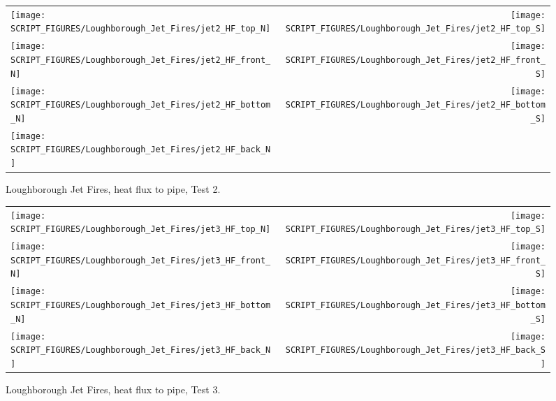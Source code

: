 \begin{figure}[p]
\begin{tabular*}{\textwidth}{l@{\extracolsep{\fill}}r}
\texttt{[image: SCRIPT\_FIGURES/Loughborough\_Jet\_Fires/jet2\_HF\_top\_N]} &
\texttt{[image: SCRIPT\_FIGURES/Loughborough\_Jet\_Fires/jet2\_HF\_top\_S]} \\
\texttt{[image: SCRIPT\_FIGURES/Loughborough\_Jet\_Fires/jet2\_HF\_front\_N]} &
\texttt{[image: SCRIPT\_FIGURES/Loughborough\_Jet\_Fires/jet2\_HF\_front\_S]} \\
\texttt{[image: SCRIPT\_FIGURES/Loughborough\_Jet\_Fires/jet2\_HF\_bottom\_N]} &
\texttt{[image: SCRIPT\_FIGURES/Loughborough\_Jet\_Fires/jet2\_HF\_bottom\_S]} \\
\texttt{[image: SCRIPT\_FIGURES/Loughborough\_Jet\_Fires/jet2\_HF\_back\_N]} &
\end{tabular*}
\caption[Loughborough Jet Fires, heat flux to pipe, Test 2]{Loughborough Jet Fires, heat flux to pipe, Test 2.}
\label{Loughborough_2}
\end{figure}

\begin{figure}[p]
\begin{tabular*}{\textwidth}{l@{\extracolsep{\fill}}r}
\texttt{[image: SCRIPT\_FIGURES/Loughborough\_Jet\_Fires/jet3\_HF\_top\_N]} &
\texttt{[image: SCRIPT\_FIGURES/Loughborough\_Jet\_Fires/jet3\_HF\_top\_S]} \\
\texttt{[image: SCRIPT\_FIGURES/Loughborough\_Jet\_Fires/jet3\_HF\_front\_N]} &
\texttt{[image: SCRIPT\_FIGURES/Loughborough\_Jet\_Fires/jet3\_HF\_front\_S]} \\
\texttt{[image: SCRIPT\_FIGURES/Loughborough\_Jet\_Fires/jet3\_HF\_bottom\_N]} &
\texttt{[image: SCRIPT\_FIGURES/Loughborough\_Jet\_Fires/jet3\_HF\_bottom\_S]} \\
\texttt{[image: SCRIPT\_FIGURES/Loughborough\_Jet\_Fires/jet3\_HF\_back\_N]} &
\texttt{[image: SCRIPT\_FIGURES/Loughborough\_Jet\_Fires/jet3\_HF\_back\_S]}
\end{tabular*}
\caption[Loughborough Jet Fires, heat flux to pipe, Test 3]{Loughborough Jet Fires, heat flux to pipe, Test 3.}
\label{Loughborough_3}
\end{figure}

